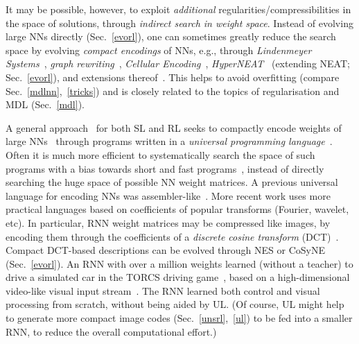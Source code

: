 \documentclass[letterpaper]{article}
\begin{document}
\begin{CJK*}{UTF8}{gbsn}
It may be possible, however, to exploit {\em additional} regularities/compressibilities 
in the space of solutions, through {\em indirect search in weight space}.
Instead of evolving large NNs directly (Sec.~\ref{evorl}), one can sometimes greatly reduce
the search space by evolving 
{\em compact encodings} of NNs, e.g.,  through  {\em Lindenmeyer Systems}~\citep{lindenmayer68,lindenmayer94}, {\em graph rewriting}~\citep{kitano90}, {\em Cellular Encoding}~\citep{gruau:tr96-048}, {\em HyperNEAT}~\citep{stanley07,stanley09,clune2011,vandenberg2013} (extending
NEAT; Sec.~\ref{evorl}), and extensions thereof~\citep[e.g.,][]{risi2012}. 
This helps to avoid overfitting (compare Sec.~\ref{mdlnn},~\ref{tricks}) and is 
closely related to the topics of regularisation 
and MDL (Sec.~\ref{mdl}).

A general approach~\citep{Schmidhuber:97nn+} for both SL and RL seeks to compactly encode weights of large NNs~\citep{Schmidhuber:97nn+} through programs written in a {\em universal programming language}~\citep{Goedel:31,Church:36,Turing:36,Post:36}. Often it is much more efficient to systematically search the space of such programs with a bias towards short and fast 
programs~\citep{Levin:73,Schmidhuber:97nn+,Schmidhuber:04oops}, 
instead of directly 
searching the huge space of possible NN weight matrices.
A previous 
universal language for encoding NNs  was assembler-like~\citep{Schmidhuber:97nn+}. More recent work uses more practical languages based on coefficients of popular transforms (Fourier, wavelet, etc). 
In particular, 
 RNN weight matrices may be compressed like images, by encoding them through the coefficients of a 
{\em discrete cosine transform} (DCT)~\citep{koutnik:gecco10,koutnik:gecco13}.
Compact DCT-based descriptions can be evolved through NES or CoSyNE
(Sec.~\ref{evorl}).
An RNN with over a million weights learned (without a teacher) to drive a simulated car 
in the TORCS driving game~\citep{wcci:torcs:09,torcs-manual:2011},
based on a high-dimensional video-like visual input stream~\citep{koutnik:gecco13}.
The RNN learned both control and visual processing from scratch, without being
aided by UL. (Of course, UL might help to generate more compact image codes
(Sec.~\ref{unsrl},~\ref{ul})
 to be fed into a smaller RNN, 
to reduce the overall computational effort.) 


\end{CJK*}
\end{document}

